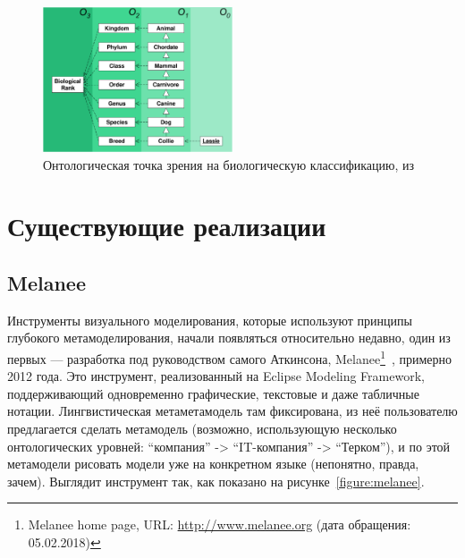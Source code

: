 \documentclass[a5paper]{article}
\begin{document}
\begin{figure}
	\begin{center}
		\includegraphics[width=0.5\textwidth]{biologicalClassification.png}
	\end{center}
	\caption{Онтологическая точка зрения на биологическую классификацию, из~\cite{atkinson2003model}}
	\label{figure:biologicalClassification}
\end{figure}

\section{Существующие реализации}

\subsection{Melanee}

Инструменты визуального моделирования, которые используют принципы глубокого метамоделирования, начали появляться относительно недавно, один из первых --- разработка под руководством самого Аткинсона, Melanee\footnote{Melanee home page, URL: \url{http://www.melanee.org} (дата обращения: 05.02.2018)}~\cite{atkinson2016melanee}, примерно 2012 года. Это инструмент, реализованный на Eclipse Modeling Framework, поддерживающий одновременно графические, текстовые и даже табличные нотации. Лингвистическая метаметамодель там фиксирована, из неё пользователю предлагается сделать метамодель (возможно, использующую несколько онтологических уровней: ``компания'' -> ``IT-компания'' -> ``Терком''), и по этой метамодели рисовать модели уже на конкретном языке (непонятно, правда, зачем). Выглядит инструмент так, как показано на рисунке~\ref{figure:melanee}.
\end{document}
